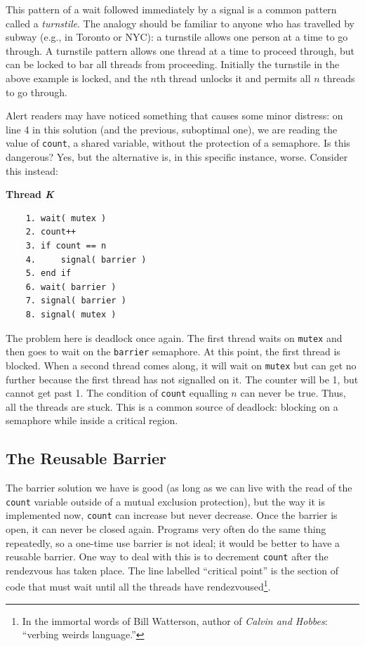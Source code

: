 This pattern of a wait followed immediately by a signal is a common pattern called a \textit{turnstile}. The analogy should be familiar to anyone who has travelled by subway (e.g., in Toronto or NYC): a turnstile allows one person at a time to go through. A turnstile pattern allows one thread at a time to proceed through, but can be locked to bar all threads from proceeding. Initially the turnstile in the above example is locked, and the $n$th thread unlocks it and permits all $n$ threads to go through.

Alert readers may have noticed something that causes some minor distress: on line 4 in this solution (and the previous, suboptimal one), we are reading the value of \texttt{count}, a shared variable, without the protection of a semaphore. Is this dangerous? Yes, but the alternative is, in this specific instance, worse. Consider this instead:

\textbf{Thread \textit{K}}\vspace{-2em}
  \begin{verbatim}
	1. wait( mutex )
	2. count++
	3. if count == n
	4.     signal( barrier )
	5. end if
	6. wait( barrier )
	7. signal( barrier )
	8. signal( mutex )
  \end{verbatim}
\vspace{-2em}

The problem here is deadlock once again. The first thread waits on \texttt{mutex} and then goes to wait on the \texttt{barrier} semaphore. At this point, the first thread is blocked. When a second thread comes along, it will wait on \texttt{mutex} but can get no further because the first thread has not signalled on it. The counter will be 1, but cannot get past 1. The condition of \texttt{count} equalling $n$ can never be true. Thus, all the threads are stuck. This is a common source of deadlock: blocking on a semaphore while inside a critical region.

\subsection*{The Reusable Barrier}
The barrier solution we have is good (as long as we can live with the read of the \texttt{count} variable outside of a mutual exclusion protection), but the way it is implemented now, \texttt{count} can increase but never decrease. Once the barrier is open, it can never be closed again. Programs very often do the same thing repeatedly, so a one-time use barrier is not ideal; it would be better to have a reusable barrier. One way to deal with this is to decrement \texttt{count} after the rendezvous has taken place. The line labelled ``critical point'' is the section of code that must wait until all the threads have rendezvoused\footnote{In the immortal words of Bill Watterson, author of \textit{Calvin and Hobbes}: ``verbing weirds language.''}.


